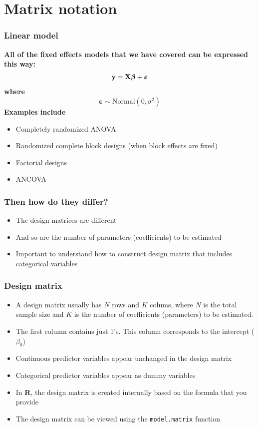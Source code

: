 \documentclass[color=usenames,dvipsnames]{beamer}\usepackage[]{graphicx}\usepackage[]{color}
\begin{document}
\section{Matrix notation}





\begin{frame}
  \frametitle{Linear model}
  {\bf All of the fixed effects models that we have covered can be
    expressed this way:}
  \[
  {\bf y} = {\bf X}{\bm \beta} + {\bm \varepsilon}
  \]
  {\bf where}
  \[
  {\bm \varepsilon} \sim \mbox{Normal}(0, \sigma^2)
  \]
  \pause
  \vfill
  {\bf Examples include} \\
  \begin{itemize}
    \item Completely randomized ANOVA
    \item Randomized complete block designs (when block effects are fixed)
    \item Factorial designs
    \item ANCOVA
  \end{itemize}
\end{frame}






\begin{frame}
  \frametitle{Then how do they differ?}
  \pause
  \large
  \begin{itemize}[<+->]
    \item The design matrices are different
    \item And so are the number of parameters (coefficients) to be
      estimated
    \item Important to understand how to construct design matrix that
      includes categorical variables
  \end{itemize}
\end{frame}




\begin{frame}%
  \frametitle{Design matrix}
  \large
  \begin{itemize}[<+->]
    \item A design matrix usually has $N$ rows and $K$ colums, where $N$ is
      the total sample size and $K$ is the number of coefficients (parameters)
      to be estimated.
    \item The first column contains just 1's. This column corresponds
      to the intercept ($\beta_0$)
    \item Continuous predictor variables appear unchanged in the design matrix
    \item Categorical predictor variables appear as dummy variables
    \item In {\bf R}, the design matrix is created internally based on
      the formula that you provide
    \item The design matrix can be viewed using the {\tt model.matrix} function
  \end{itemize}
\end{frame}
\end{document}
